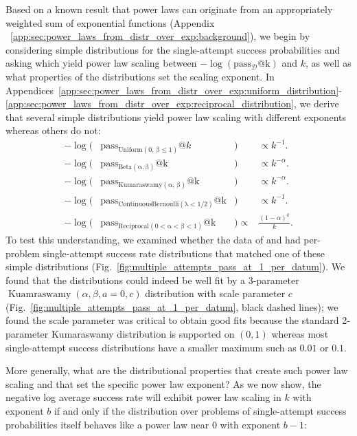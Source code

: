 Based on a known result that power laws can originate from an appropriately weighted sum of exponential functions (Appendix ~\ref{app:sec:power_laws_from_distr_over_exp:background}), we begin by considering simple distributions for the single-attempt success probabilities and asking which yield power law scaling between $-\log(\operatorname{pass_{\mathcal{D}}@k})$ and $k$, as well as what properties of the distributions set the scaling exponent. In Appendices~\ref{app:sec:power_laws_from_distr_over_exp:uniform_distribution}-\ref{app:sec:power_laws_from_distr_over_exp:reciprocal_distribution}, we derive that several simple distributions yield power law scaling with different exponents whereas others do not:
%
\begin{align*}
    -\log \Big( &\operatorname{pass_{\mathrm{Uniform}(0,\, \beta \leq 1)}}@k &\Big) &\propto k^{-1}.\\
    -\log \Big( &\operatorname{pass_{\operatorname{Beta(\alpha, \beta)}}@k} &\Big) &\propto k^{-\alpha}.\\
    -\log \Big( &\operatorname{pass_{\operatorname{Kumaraswamy(\alpha,\, \beta)}}@k} &\Big) &\propto k^{-\alpha}.\\
    -\log \Big( &\operatorname{pass_{\operatorname{ContinuousBernoulli(\lambda < 1/2)}}@k} &\Big) &\propto k^{-1}.\\
    -\log \Big( &\operatorname{pass_{\operatorname{Reciprocal(0 < \alpha < \beta < 1)}}@k} &\Big) \propto &\frac{(1-\alpha)^k}{k}.
\end{align*}
%
To test this understanding, we examined whether the data of \citet{brown2024largelanguagemonkeysscaling} and \citet{hughes2024bestofnjailbreaking} had per-problem single-attempt success rate distributions that matched one of these simple distributions (Fig.~\ref{fig:multiple_attempts_pass_at_1_per_datum}). We found that the distributions could indeed be well fit by a 3-parameter $\operatorname{Kuamraswamy}(\alpha, \beta, a = 0, c)$ distribution with scale parameter $c$ (Fig.~\ref{fig:multiple_attempts_pass_at_1_per_datum}, black dashed lines); we found the scale parameter was critical to obtain good fits because the standard 2-parameter Kumaraswamy distribution is supported on $(0, 1)$ whereas most single-attempt success distributions have a smaller maximum such as $0.01$ or $0.1$.

More generally, what are the distributional properties that create such power law scaling and that set the specific power law exponent?
As we now show, the negative log average success rate will exhibit power law scaling in $k$ with exponent $b$ if and only if the distribution over problems of single-attempt success probabilities itself behaves like a power law near $0$ with exponent $b-1$:\newline

